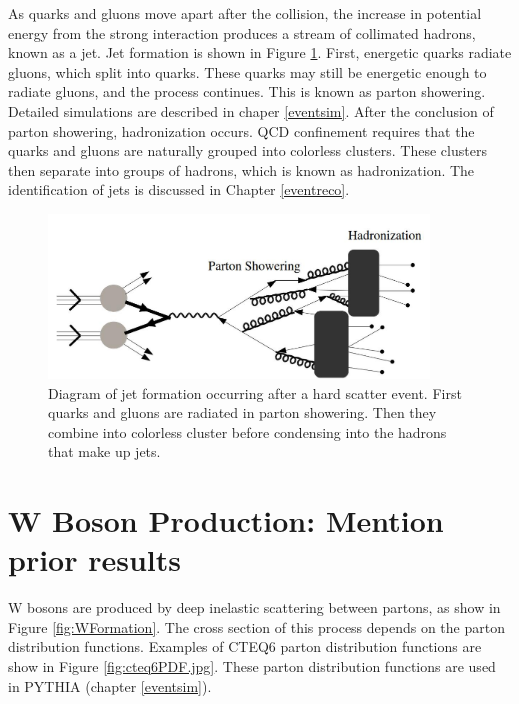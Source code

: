 \documentclass[oneside, letterpaper, oldfontcommands]{memoir}
\begin{document}
\qquad As quarks and gluons move apart after the collision, the increase in potential energy from the strong interaction produces a stream of collimated hadrons, known as a jet. Jet formation is shown in Figure \ref{fig:JetFormation}. First, energetic quarks radiate gluons, which split into quarks. These quarks may still be energetic enough to radiate gluons, and the process continues. This is known as parton showering. Detailed simulations are described in chaper \ref{eventsim}. After the conclusion of parton showering, hadronization occurs. QCD confinement requires that the quarks and gluons are naturally grouped into colorless clusters. These clusters then separate into groups of hadrons, which is known as hadronization. The identification of jets is discussed in Chapter \ref{eventreco}.

\begin{figure}[here]
\includegraphics[width=0.9\textwidth]{jetformation.jpg}
\caption{Diagram of jet formation occurring after a hard scatter event. First quarks and gluons are radiated in parton showering. Then they combine into colorless cluster before condensing into the hadrons that make up jets.}
\label{fig:JetFormation}
\end{figure}



\section{W Boson Production: Mention prior results}\label{wboson}
\qquad W bosons are produced by deep inelastic scattering between partons, as show in Figure \ref{fig:WFormation}. The cross section of this process depends on the parton distribution functions. Examples of CTEQ6 parton distribution functions are show in Figure \ref{fig:cteq6PDF.jpg}\cite{Pumplin:2002vw}. These parton distribution functions are used in PYTHIA (chapter \ref{eventsim}).
\end{document}
